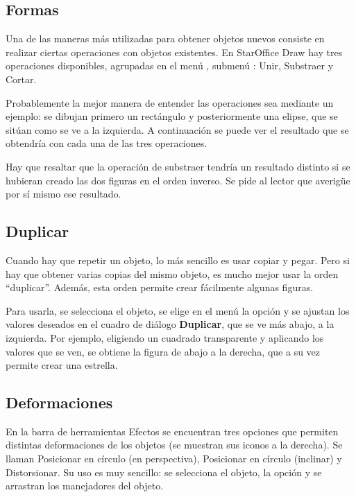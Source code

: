 \subsection{Formas}

Una de las maneras más utilizadas para obtener objetos nuevos consiste
en realizar ciertas operaciones con objetos existentes. En StarOffice
Draw hay tres operaciones disponibles, agrupadas en el menú
, submenú : Unir, Substraer y Cortar.

Probablemente la mejor manera de entender las operaciones sea mediante
un ejemplo: se dibujan primero un rectángulo y posteriormente una
elipse, que se sitúan como se ve a la izquierda. A continuación se
puede ver el resultado que se obtendría con cada una de las tres
operaciones.

Hay que resaltar que la operación de substraer tendría un resultado
distinto si se hubieran creado las dos figuras en el orden inverso. Se
pide al lector que averigüe por sí mismo ese resultado.

\subsection{Duplicar}

Cuando hay que repetir un objeto, lo más sencillo es usar copiar y
pegar. Pero si hay que obtener varias copias del mismo objeto, es
mucho mejor usar la orden ``duplicar''. Además, esta orden permite
crear fácilmente algunas figuras.

Para usarla, se selecciona el objeto, se elige en el menú
 la opción  y se ajustan los valores
deseados en el cuadro de diálogo \textbf{Duplicar}, que se ve más
abajo, a la izquierda. Por ejemplo, eligiendo un cuadrado transparente
y aplicando los valores que se ven, se obtiene la figura de abajo a la
derecha, que a su vez permite crear una estrella.

\subsection{Deformaciones}

En la barra de herramientas Efectos se encuentran tres opciones que
permiten distintas deformaciones de los objetos (se muestran sus
iconos a la derecha). Se llaman Posicionar en círculo (en
perspectiva), Posicionar en círculo (inclinar) y Distorsionar. Su uso
es muy sencillo: se selecciona el objeto, la opción y se arrastran los
manejadores del objeto.

